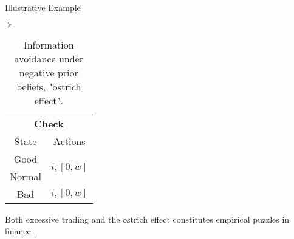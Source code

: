 \documentclass[usenames,dvipsnames,aspectratio=169,11pt, envcountsect]{beamer}
\begin{document}
\begin{frame}{Illustrative Example}
\begin{table}[H]
		\( \succ \) %
		\begin{minipage}{0.29\textwidth}
			\centering
			\begin{tabular}{c | c}
				\multicolumn{2}{c}{\textbf{Check}}                                                                            \\
				State                        & Actions                                                                        \\
				\hline
				{\color{bleudefrance}Good}   & \multirow{2}{*}{{\color{bleudefrance}\( i, \left[ 0, \overline{w} \right] \)}} \\
				{\color{bleudefrance}Normal} &                                                                                \\
				Bad                          & \(  i, \left[0, w \right] \)                                                   \\
			\end{tabular}
			\vspace{0.5cm} %
		\end{minipage}
		\caption{Information avoidance under negative prior beliefs, "ostrich effect".} %
		\label{tab:oistrich}
	\end{table}

	Both excessive trading and the ostrich effect constitutes empirical puzzles in finance \citep{danielOverconfidentInvestorsPredictable2015,golmanInformationAvoidance2017}.

\end{frame}
\end{document}
